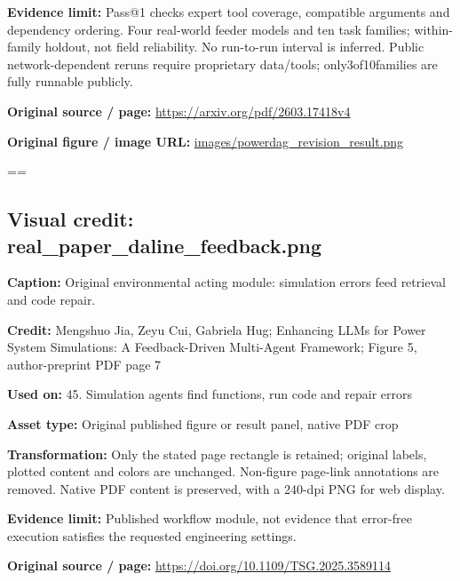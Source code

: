 \documentclass[10pt,letterpaper]{article}
\begin{document}
\textbf{Evidence limit:} Pass@1 checks expert tool coverage, compatible arguments and dependency ordering. Four real-world feeder models and ten task families; within-family holdout, not field reliability. No run-to-run interval is inferred. Public network-dependent reruns require proprietary data/tools; only3of10families are fully runnable publicly.\par
\textbf{Original source / page:} \href{https://arxiv.org/pdf/2603.17418v4}{\small\ttfamily https:/\allowbreak{}/\allowbreak{}arxiv.\allowbreak{}org/\allowbreak{}pdf/\allowbreak{}2603.\allowbreak{}17418v4}\par
\textbf{Original figure / image URL:} \href{images/powerdag_revision_result.png}{\small\ttfamily images/\allowbreak{}powerdag\_\allowbreak{}revision\_\allowbreak{}result.\allowbreak{}png}\par
\egroup\par\noindent\box\readingEntry\par\medskip
\setbox\readingEntry=\vbox\bgroup\hsize=\linewidth\subsection*{Visual credit: real\_paper\_daline\_feedback.png}
\textbf{Caption:} Original environmental acting module: simulation errors feed retrieval and code repair.\par
\textbf{Credit:} Mengshuo Jia, Zeyu Cui, Gabriela Hug; Enhancing LLMs for Power System Simulations: A Feedback-Driven Multi-Agent Framework; Figure 5, author-preprint PDF page 7\par
\textbf{Used on:} 45. Simulation agents find functions, run code and repair errors\par
\textbf{Asset type:} Original published figure or result panel, native PDF crop\par
\textbf{Transformation:} Only the stated page rectangle is retained; original labels, plotted content and colors are unchanged. Non-figure page-link annotations are removed. Native PDF content is preserved, with a 240-dpi PNG for web display.\par
\textbf{Evidence limit:} Published workflow module, not evidence that error-free execution satisfies the requested engineering settings.\par
\textbf{Original source / page:} \href{https://doi.org/10.1109/TSG.2025.3589114}{\small\ttfamily https:/\allowbreak{}/\allowbreak{}doi.\allowbreak{}org/\allowbreak{}10.\allowbreak{}1109/\allowbreak{}TSG.\allowbreak{}2025.\allowbreak{}3589114}\par
\end{document}
